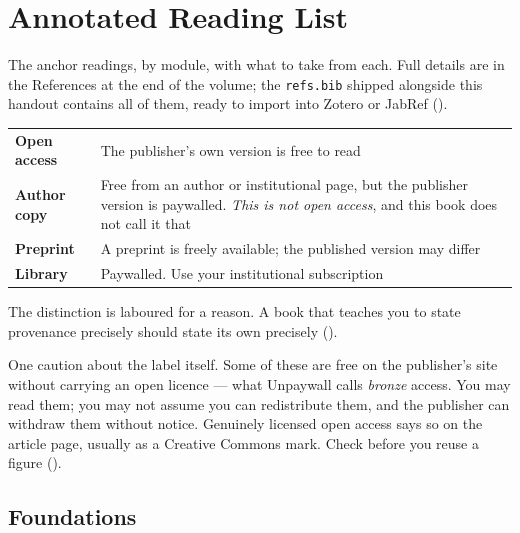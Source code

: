 \chapter{Annotated Reading List}\label{app:reading}

The anchor readings, by module, with what to take from each. Full details are
in the References at the end of the volume; the \texttt{refs.bib} shipped
alongside this handout contains all of them, ready to import into Zotero or
JabRef ().

\begin{alertbox}
\begin{center}
\small
\begin{tabular}{@{}L{3.4cm}L{10.7cm}@{}}
\toprule
\oa{} \textbf{Open access} & The publisher's own version is free to read \\
\textbf{Author copy}       & Free from an author or institutional page, but the
                             publisher version is paywalled. \emph{This is not
                             open access}, and this book does not call it that \\
\textbf{Preprint}          & A preprint is freely available; the published
                             version may differ \\
\textbf{Library}           & Paywalled. Use your institutional subscription \\
\bottomrule
\end{tabular}
\end{center}
\medskip
The distinction is laboured for a reason. A book that teaches you to state
provenance precisely should state its own precisely
().

\medskip
One caution about the \oa{} label itself. Some of these are free on the
publisher's site without carrying an open licence --- what Unpaywall calls
\emph{bronze} access. You may read them; you may not assume you can
redistribute them, and the publisher can withdraw them without notice.
Genuinely licensed open access says so on the article page, usually as a
Creative Commons mark. Check before you reuse a figure
().
\end{alertbox}

\section{Foundations}

